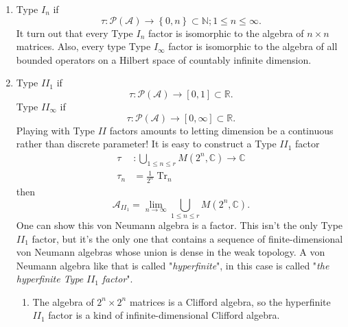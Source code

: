 \documentclass[aps,preprint]{revtex4}%
\begin{document}
\begin{enumerate}
\item Type $I_{n}$ if
\begin{equation}
\tau:\mathcal{P}\left(  \mathcal{A}\right)  \rightarrow\left\{  0,n\right\}
\subset\mathbb{N};1\leq n\leq\infty.
\end{equation}
It turn out that every Type $I_{n}$ factor is isomorphic to the algebra of
$n\times n$ matrices. Also, every type Type $I_{\infty}$ factor is isomorphic
to the algebra of all bounded operators on a Hilbert space of countably
infinite dimension.

\item Type $II_{1}$ if
\begin{equation}
\tau:\mathcal{P}\left(  \mathcal{A}\right)  \rightarrow\left[  0,1\right]
\subset\mathbb{R}.
\end{equation}
Type $II_{\infty}$ if
\begin{equation}
\tau:\mathcal{P}\left(  \mathcal{A}\right)  \rightarrow\left[  0,\infty
\right]  \subset\mathbb{R}.
\end{equation}
Playing with Type $II$ factors amounts to letting dimension be a continuous
rather than discrete parameter! It is easy to construct a Type $II_{1}$
factor
\begin{align}
\tau &  :%
{\textstyle\bigcup\limits_{1\leq n\leq r}}
M\left(  2^{n},\mathbb{C}\right)  \rightarrow\mathbb{C}\\
\left.  \tau\right.  _{n}  &  =\frac{1}{2^{n}}\left.  \operatorname{Tr}%
\right.  _{n}%
\end{align}
then
\begin{equation}
\mathcal{A}_{II_{1}}=\lim\limits_{n\rightarrow\infty}%
{\textstyle\bigcup\limits_{1\leq n\leq r}}
M\left(  2^{n},\mathbb{C}\right)  .
\end{equation}
One can show this von Neumann algebra is a factor. This isn't the only Type
$II_{1}$ factor, but it's the only one that contains a sequence of
finite-dimensional von Neumann algebras whose union is dense in the weak
topology. A von Neumann algebra like that is called "\emph{hyperfinite}", in
this case is called "\emph{the hyperfinite Type} $II_{1}$ \emph{factor}".

\begin{enumerate}
\item The algebra of $2^{n}\times2^{n}$ matrices is a Clifford algebra, so the
hyperfinite $II_{1}$ factor is a kind of infinite-dimensional Clifford algebra.


\end{enumerate}
\end{enumerate}
\end{document}

